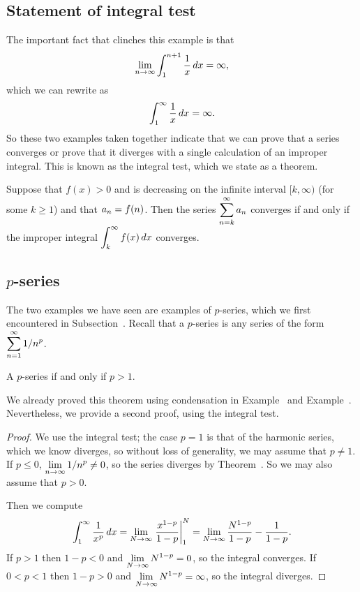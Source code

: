 \subsection{Statement of integral test}

The important fact that clinches this example is that
$$\lim_{n\to\infty} \int_1^{n+1} {1\over x}\,dx = \infty,$$
which we can rewrite as
$$\int_1^\infty {1\over x}\,dx = \infty.$$
So these two examples taken together indicate that we can prove that a
series converges or prove that it diverges with a single calculation
of an improper integral. This is known as the {\dfont integral
  test\/}, 
which we state as a theorem.

\begin{theorem}\label{thm:integral-test}
 Suppose that $f(x)>0$ and is decreasing on the infinite interval
$[k,\infty)$ (for some $k\ge1$)
and that $\displaystyle a_n=f(n)$. Then the series
$\displaystyle\sum_{n=k}^\infty a_n$ converges if and only if the improper
integral $\displaystyle\int_{k}^\infty f(x)\,dx$ converges.
\end{theorem}

\subsection{$p$-series}
\label{subsection:p-series-via-integration}

The two examples we have seen are examples of
$p$-series, which we first encountered in Subsection~.
Recall that a $p$-series is
any series of the form $\displaystyle \sum_{n=1}^\infty 1/n^p$.

\begin{theorem}\label{thm:p-series} A $p$-series if and only if $p>1$.
\end{theorem}

We already proved this theorem using condensation in Example~ and Example~.  Nevertheless, we provide a second proof, using the integral test.

\begin{proof}
We use the integral test; the case $p=1$ is that of the harmonic series, which we know diverges, so without loss of generality, we may assume that
$p \neq 1$.   If $p\le0$, $\displaystyle\lim_{n\to\infty} 1/n^p\not=0$, so the series diverges by Theorem~. So we may also assume that $p > 0$.

Then we compute
$$
  \int_1^{\infty} {1\over x^p}\,dx=\lim_{N\to\infty} \left.{x^{1-p}\over
  1-p}\right|_{1}^N=\lim_{N\to\infty} {N^{1-p}\over 1-p}-{1\over 1-p}.
$$
If $p>1$ then $1-p<0$ and $\displaystyle\lim_{N\to\infty}N^{1-p}=0$, so the
  integral converges. If $0<p<1$ then $1-p>0$ and 
$\displaystyle\lim_{N\to\infty}N^{1-p}=\infty$, so the integral diverges.
\end{proof}

